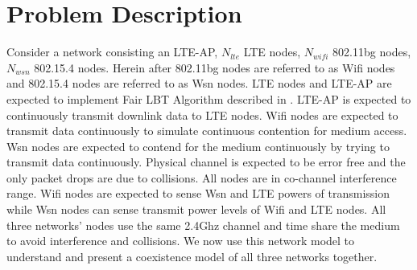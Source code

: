 \documentclass{article}
\begin{document}
	\section{Problem Description}
	Consider a network consisting an {LTE-AP}, $N_{lte}$ {LTE} nodes, $N_{wifi}$ 802.11bg nodes, $N_{wsn}$ 802.15.4 nodes. Herein after 802.11bg nodes are referred to as {Wifi} nodes and 802.15.4 nodes are referred to as {Wsn} nodes. {LTE} nodes and {LTE-AP} are expected to implement Fair LBT Algorithm described in \cite{7419263}. {LTE-AP} is expected to continuously transmit downlink data to {LTE} nodes. {Wifi} nodes are expected to transmit data continuously to simulate continuous contention for medium access. {Wsn} nodes are expected to contend for the medium continuously by trying to transmit data continuously. Physical channel is expected to be error free and the only packet drops are due to collisions. All nodes are in co-channel interference range. {Wifi} nodes are expected to sense {Wsn} and {LTE} powers of transmission while {Wsn} nodes can sense transmit power levels of {Wifi} and {LTE} nodes. All three networks' nodes use the same {2.4Ghz} channel and time share the medium to avoid interference and collisions. We now use this network model to understand and present a coexistence model of all three networks together.
	
	
	
	\nocite{*}	


\end{document}

